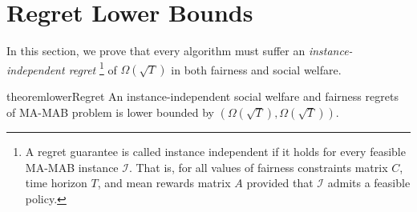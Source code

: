 \section{Regret Lower Bounds}
\label{subsec:lowerBound}
\iffalse 
\begin{definition}[Instance-Independent Simultaneous Regret Bound]
    We say that an MA-MAB instance admits an instance-independent regret bound of $(T^\alpha, T^\beta)$ if for any feasible instance $\mathcal{I} 
    $
    , we have that 
    \begin{enumerate}
        \item $\mathcal{R}_{SW}(T)  = \Omega(T^\alpha)$, and 
        \item $\mathcal{R}_{FR}(T)  = \Omega(T^\beta)$.
    \end{enumerate}
\end{definition}
\fi 
In this section, we  prove that every algorithm must suffer an \emph{instance-independent regret} \footnote{ A regret guarantee is called instance independent if it  holds for every feasible MA-MAB instance  $\mathcal{I}$.  That is,  for all values of fairness constraints matrix $C$, time horizon $T$, and mean rewards matrix $A$ provided that  $\mathcal{I}$ admits a feasible policy.}  of $\Omega(\sqrt{T})$  in both fairness and social welfare.     
\begin{restatable}{theorem}{lowerRegret}
\label{thm:lowerBound}
An instance-independent social welfare and fairness regrets of MA-MAB problem is lower bounded by $(\Omega(\sqrt{T}), \Omega(\sqrt{T}))$. 
\end{restatable}
